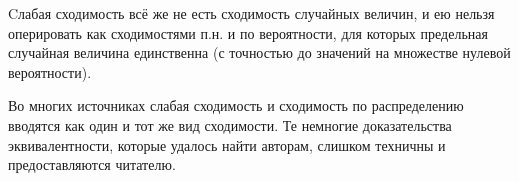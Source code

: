 \begin{rmrk}
    Cлабая сходимость всё же не есть сходимость случайных величин, и ею нельзя оперировать как сходимостями п.н. и по вероятности, для которых предельная случайная величина единственна (с точностью до значений на множестве нулевой вероятности).
\end{rmrk}

\begin{rmrk}
    Во многих источниках слабая сходимость и сходимость по распределению вводятся как один и тот же вид сходимости. Те немногие доказательства эквивалентности, которые удалось найти авторам, слишком техничны и предоставляются читателю.
\end{rmrk}
